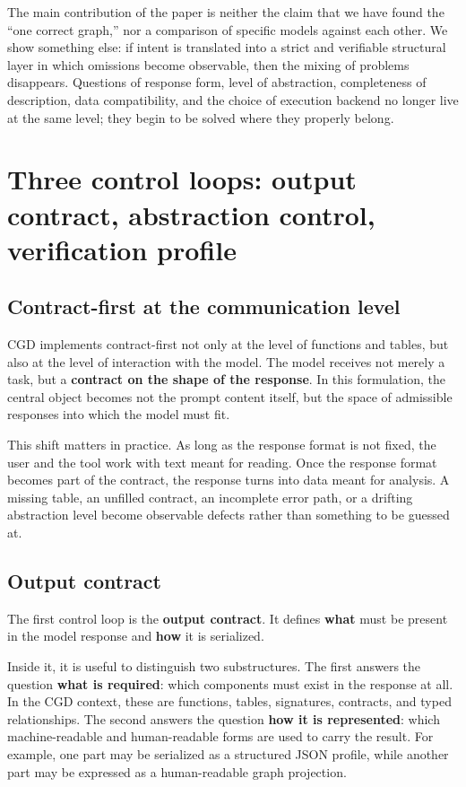 \documentclass[12pt,a4paper]{article}
\begin{document}
The main contribution of the paper is neither the claim that we have found the ``one correct graph,'' nor a comparison of specific models against each other. We show something else: if intent is translated into a strict and verifiable structural layer in which omissions become observable, then the mixing of problems disappears. Questions of response form, level of abstraction, completeness of description, data compatibility, and the choice of execution backend no longer live at the same level; they begin to be solved where they properly belong.

\section{Three control loops: output contract, abstraction control, verification profile}

\subsection{Contract-first at the communication level}

CGD implements contract-first not only at the level of functions and tables, but also at the level of interaction with the model. The model receives not merely a task, but a \textbf{contract on the shape of the response}. In this formulation, the central object becomes not the prompt content itself, but the space of admissible responses into which the model must fit.

This shift matters in practice. As long as the response format is not fixed, the user and the tool work with text meant for reading. Once the response format becomes part of the contract, the response turns into data meant for analysis. A missing table, an unfilled contract, an incomplete error path, or a drifting abstraction level become observable defects rather than something to be guessed at.

\subsection{Output contract}

The first control loop is the \textbf{output contract}. It defines \textbf{what} must be present in the model response and \textbf{how} it is serialized.

Inside it, it is useful to distinguish two substructures. The first answers the question \textbf{what is required}: which components must exist in the response at all. In the CGD context, these are functions, tables, signatures, contracts, and typed relationships. The second answers the question \textbf{how it is represented}: which machine-readable and human-readable forms are used to carry the result. For example, one part may be serialized as a structured JSON profile, while another part may be expressed as a human-readable graph projection.
\end{document}
